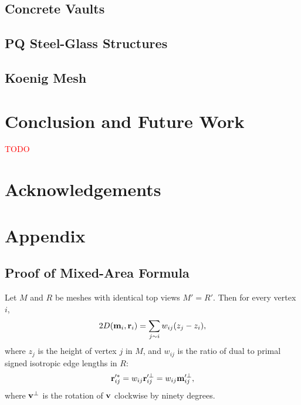 \documentclass[annual]{acmsiggraph}
\newcommand{\todo}[1]{\textcolor{red}{#1}}
\begin{document}
\subsection{Concrete Vaults}

\subsection{PQ Steel-Glass Structures}

\subsection{Koenig Mesh} \label{sec:koenig}

\section{Conclusion and Future Work}

\todo{TODO}

\section*{Acknowledgements}




\section{Appendix}
\subsection{Proof of Mixed-Area Formula}
Let $M$ and $R$ be meshes with identical top views $M'=R'$. Then for every vertex $i$,
\begin{equation*}
2D({\mathbf m}_i,{\mathbf r}_i) = \sum_{j\sim i} w_{ij} (z_j - z_i),
\end{equation*}
where $z_j$ is the height of vertex $j$ in $M$, and $w_{ij}$ is the ratio of dual to primal signed isotropic edge lengths in $R$: 
\begin{equation*}
{\mathbf r}'^{*}_{ij} = w_{ij}{\mathbf r}'^{\perp}_{ij} = w_{ij}{\mathbf m}'^{\perp}_{ij},
\end{equation*}
where ${\mathbf v}^{\perp}$ is the rotation of ${\mathbf v}$ clockwise by ninety degrees.
\end{document}
